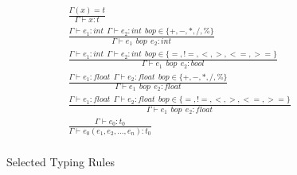 

\begin{figure}[ht!]
\centering
\small
\begin{align*}
  \tag{T-VARIABLE}
  &\frac
  {\Gamma(x)=t}
  {\Gamma \vdash x:t}\\
  \tag{T-INT ARITH}
  &\frac
  {\Gamma \vdash e_1:int ~~ \Gamma \vdash e_2:int ~~ bop \in \{+,-,*,/,\%\}}
  {\Gamma \vdash e_1 ~~ bop ~~ e_2 :int} \\
  \tag{T-INT REL}
  &\frac
  {\Gamma \vdash e_1:int ~~ \Gamma \vdash e_2:int ~~ bop \in \{=, !=, <, >, <=, >=\}}
  {\Gamma \vdash e_1 ~~ bop ~~ e_2 :bool} \\
  \tag{T-FLOAT ARITH}
  &\frac
  {\Gamma \vdash e_1:float ~~ \Gamma \vdash e_2:float ~~ bop \in \{+,-,*,/,\%\}}
  {\Gamma \vdash e_1 ~~ bop ~~ e_2 :float}\\
  \tag{T-FLOAT REL}
  &\frac
  {\Gamma \vdash e_1:float ~~ \Gamma \vdash e_2:float ~~ bop \in \{=, !=, <, >, <=, >=\}}
  {\Gamma \vdash e_1 ~~ bop ~~ e_2 :float}\\
  \tag{T-CONSTRAINT}
  &\frac
  {\Gamma \vdash e_0:t_0}
  {\Gamma \vdash e_0(e_1, e_2, ..., e_n):t_0}\\
  \end{align*}
\caption{Selected Typing Rules}\label{fig:typingrule}
\end{figure}
